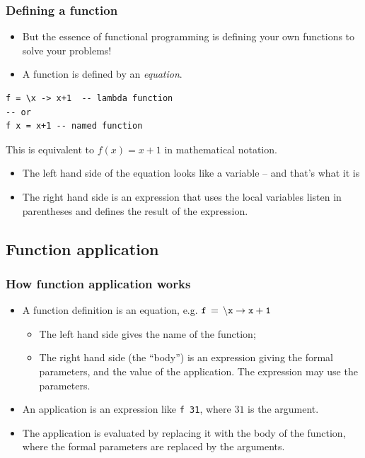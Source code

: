\documentclass{beamer}
\begin{document}
\begin{frame}[fragile]
\frametitle{Defining a function}

\begin{itemize}
\item But the essence of functional programming is defining your own
  functions to solve your problems!
\item A function is defined by an
  \emph{equation}.
\end{itemize}

\begin{verbatim}
f = \x -> x+1  -- lambda function
-- or
f x = x+1 -- named function
\end{verbatim}

This is equivalent to $f(x) = x+1$ in mathematical notation.

\begin{itemize}
\item The left hand side of the equation looks like a variable -- and that's what it is
\item The right hand side is an expression that uses the local variables listen in parentheses and defines the result of the expression.

\end{itemize}

\end{frame}

\subsection{Function application}

\begin{frame}[fragile]
\frametitle{How function application works}

\begin{itemize}
\item A function definition is an equation, e.g. $\tt{f \, =\, \backslash x \rightarrow x+1}$
  \begin{itemize}
  \item The left hand side gives the name of the function;
  \item The right hand side (the ``body'') is an expression giving the
    formal parameters, and  the value of the application.  The expression may use the
    parameters.
  \end{itemize}
\item An application is an expression like \texttt{f 31}, where $31$ is
  the argument.
\item The application is evaluated by replacing it with the body of
  the function, where the formal parameters are replaced by the
  arguments.
\end{itemize}

\end{frame}
\end{document}
